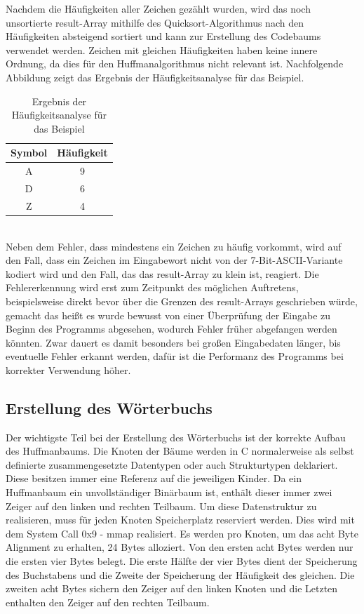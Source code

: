 \documentclass[course=erap]{aspdoc}
\begin{document}
Nachdem die Häufigkeiten aller Zeichen gezählt wurden, wird das noch unsortierte result-Array mithilfe des Quicksort-Algorithmus nach den Häufigkeiten absteigend sortiert und kann zur Erstellung des Codebaums verwendet werden. Zeichen mit gleichen Häufigkeiten haben keine innere Ordnung, da dies für den Huffmanalgorithmus nicht relevant ist. Nachfolgende Abbildung zeigt das Ergebnis der Häufigkeitsanalyse für das Beispiel.\\
\begin{table}[h]
\centering
\begin{tabular}{ | c | c | }
 \hline
 Symbol & Häufigkeit \\
 \hline
 A & 9 \\
 \hline
 D & 6 \\
 \hline
 Z & 4 \\
 \hline
\end{tabular}
\caption{Ergebnis der Häufigkeitsanalyse für das Beispiel}
\end{table}
\\
Neben dem Fehler, dass mindestens ein Zeichen zu häufig vorkommt, wird auf den Fall, dass ein Zeichen im Eingabewort nicht von der 7-Bit-ASCII-Variante kodiert wird und den Fall, das das result-Array zu klein ist, reagiert. Die Fehlererkennung wird erst zum Zeitpunkt des möglichen Auftretens, beispielsweise direkt bevor über die Grenzen des result-Arrays geschrieben würde, gemacht das heißt es wurde bewusst von einer Überprüfung der Eingabe zu Beginn des Programms abgesehen, wodurch Fehler früher abgefangen werden könnten. Zwar dauert es damit besonders bei großen Eingabedaten länger, bis eventuelle Fehler erkannt werden, dafür ist die Performanz des Programms bei korrekter Verwendung höher.\\
\label{analyse}

\subsection{Erstellung des Wörterbuchs}
\label{wörterbuch}
Der wichtigste Teil bei der Erstellung des Wörterbuchs ist der korrekte Aufbau des Huffmanbaums.\cite{huffmanArticle} Die Knoten der Bäume werden in C normalerweise als selbst definierte zusammengesetzte Datentypen oder auch Strukturtypen deklariert. Diese besitzen immer eine Referenz auf die jeweiligen Kinder. \cite{cAlsErsteProgrammiersprache} Da ein Huffmanbaum ein unvollständiger Binärbaum ist, enthält dieser immer zwei Zeiger auf den linken und rechten Teilbaum. Um diese Datenstruktur zu realisieren, muss für jeden Knoten Speicherplatz reserviert werden. Dies wird mit dem System Call 0x9 - mmap realisiert. Es werden pro Knoten, um das acht Byte Alignment zu erhalten, 24 Bytes alloziert. Von den ersten acht Bytes werden nur die ersten vier Bytes belegt. Die erste Hälfte der vier Bytes dient der Speicherung des Buchstabens und die Zweite der Speicherung der Häufigkeit des gleichen. Die zweiten acht Bytes sichern den Zeiger auf den linken Knoten und die Letzten enthalten den Zeiger auf den rechten Teilbaum.
\end{document}
